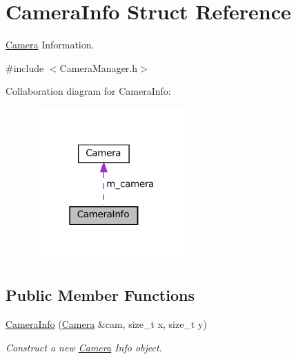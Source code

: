 \hypertarget{structCameraInfo}{}\section{Camera\+Info Struct Reference}
\label{structCameraInfo}


\hyperlink{classCamera}{Camera} Information.  




{\ttfamily \#include $<$Camera\+Manager.\+h$>$}



Collaboration diagram for Camera\+Info\+:
\nopagebreak
\begin{figure}[H]
\begin{center}
\leavevmode
\includegraphics[width=172pt]{structCameraInfo__coll__graph}
\end{center}
\end{figure}
\subsection*{Public Member Functions}
\begin{DoxyCompactItemize}
\item 
\hyperlink{structCameraInfo_acaeb61d27869ecca978751caf05b4e22}{Camera\+Info} (\hyperlink{classCamera}{Camera} \&cam, size\+\_\+t x, size\+\_\+t y)
\begin{DoxyCompactList}\small\item\em Construct a new \hyperlink{classCamera}{Camera} Info object. \end{DoxyCompactList}\end{DoxyCompactItemize}
